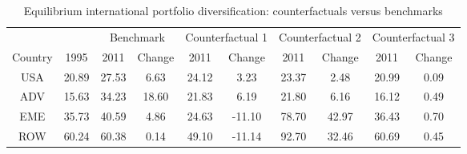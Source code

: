 \begin{table}[p]
\begin{center}
\caption{Equilibrium international portfolio diversification: counterfactuals versus benchmarks}
\label{tab:results-bal-div-bench-counter}
\small
\begin{tabular}{cccccccccc}
\toprule
& & \multicolumn{2}{c}{Benchmark}& \multicolumn{2}{c}{Counterfactual 1}& \multicolumn{2}{c}{Counterfactual 2}& \multicolumn{2}{c}{Counterfactual 3}\\
\cmidrule(rl){3-4}\cmidrule(rl){5-6}\cmidrule(rl){7-8}\cmidrule(rl){9-10}
Country & 1995 & 2011 & Change & 2011 & Change & 2011 & Change & 2011 & Change\\
\midrule
USA&20.89&27.53&6.63&24.12&3.23&23.37&2.48&20.99&0.09\\
ADV&15.63&34.23&18.60&21.83&6.19&21.80&6.16&16.12&0.49\\
EME&35.73&40.59&4.86&24.63&-11.10&78.70&42.97&36.43&0.70\\
ROW&60.24&60.38&0.14&49.10&-11.14&92.70&32.46&60.69&0.45\\
\bottomrule
\end{tabular}
\normalsize
\end{center}
\end{table}
